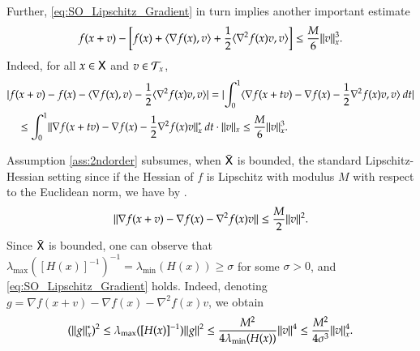 Further, \eqref{eq:SO_Lipschitz_Gradient} in turn implies another important estimate 
\begin{equation}\label{eq:cubicestimate}
f(x+v)-\left[f(x)+\langle\nabla f(x),v\rangle+\frac{1}{2}\langle\nabla^{2}f(x)v,v\rangle\right]\leq\frac{M}{6}\lVert v\rVert^{3}_{x}.
\end{equation}
Indeed, for all $x\in\mathsf{X}$ and $v\in\mathcal{T}_{x}$,
\begin{align*}
&\lvert f(x+v)-f(x)-\langle\nabla f(x),v\rangle-\frac{1}{2}\langle\nabla^{2}f(x)v,v\rangle\rvert=\lvert\int_{0}^{1}\langle\nabla f(x+tv)-\nabla f(x)-\frac{1}{2}\nabla^{2}f(x)v,v\rangle\:d t\rvert\\
&\quad\leq \int_{0}^{1}\lVert\nabla f(x+tv)-\nabla f(x)-\frac{1}{2}\nabla^{2}f(x)v\rVert_{x}^{*}\:d t\cdot\lVert v\rVert_{x} 
\leq \frac{M}{6}\lVert v\rVert^{3}_{x}.
\end{align*}
\begin{remark}
\label{Rm:Hess_Lip}
Assumption \ref{ass:2ndorder} subsumes, when $\bar{\mathsf{X}}$ is bounded, the standard Lipschitz-Hessian setting since 
if the Hessian of $f$ is Lipschitz with modulus $M$ with respect to the Euclidean norm, we have by \cite[Eq. (2.2)]{NesPol06}.
\[
\lVert\nabla f(x+v)-\nabla f(x)-\nabla^{2}f(x)v\rVert\leq\frac{M}{2}\lVert v\rVert^{2}.
\]
Since $\bar{\mathsf{X}}$ is bounded, one can observe that $\lambda_{\max}([H(x)]^{-1})^{-1}=\lambda_{\min}(H(x)) \geq \sigma$ for some $\sigma >0$, and \eqref{eq:SO_Lipschitz_Gradient} holds. Indeed, denoting $g=\nabla f(x+v)-\nabla f(x)-\nabla^{2}f(x)v$, we obtain
\[
(\lVert g\rVert_x^*)^2 \leq \lambda_{\max}([H(x)]^{-1})\lVert g\rVert^{2} \leq \frac{M^2}{4\lambda_{\min}(H(x))}\lVert v\rVert^{4} \leq \frac{M^2}{4\sigma^{3}}\lVert v\rVert_x^4.
\]
\close
\end{remark}

